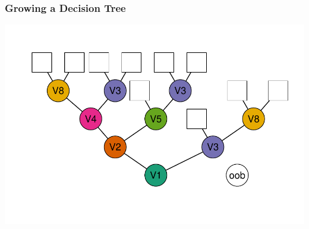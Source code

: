 \documentclass[xcolor=svgnames]{beamer}\usepackage[]{graphicx}\usepackage[]{color}
\newenvironment{knitrout}{}{} %
\begin{document}
\begin{frame}
\frametitle{Growing a Decision Tree}
\begin{knitrout}\footnotesize
{}\color{fgcolor}

{\centering \includegraphics[width=.9\linewidth]{figures/treeDiagram4-1} 

}



\end{knitrout}

\end{frame}
\end{document}
